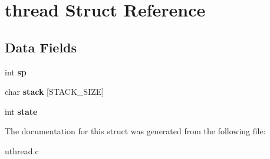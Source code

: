 \hypertarget{structthread}{}\section{thread Struct Reference}
\label{structthread}
\subsection*{Data Fields}
\begin{DoxyCompactItemize}
\item 
\mbox{\label{structthread_a35fe6e040ea7b812a63f74c885a598d6}} 
int {\bfseries sp}
\item 
\mbox{\label{structthread_a10fde37c8131d5d912d9e2030e2d9ba5}} 
char {\bfseries stack} \mbox{[}S\+T\+A\+C\+K\+\_\+\+S\+I\+ZE\mbox{]}
\item 
\mbox{\label{structthread_af4eb2d11f62e4bb8b997e60a82a68258}} 
int {\bfseries state}
\end{DoxyCompactItemize}


The documentation for this struct was generated from the following file\+:\begin{DoxyCompactItemize}
\item 
uthread.\+c\end{DoxyCompactItemize}
